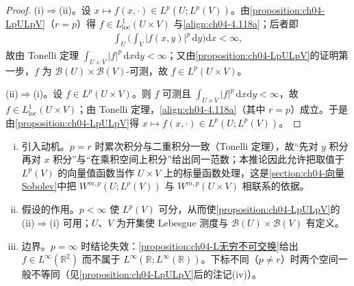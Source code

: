 \documentclass[../../main.tex]{subfiles}%
\begin{document}
\begin{proof}
(i)$\Rightarrow$(ii)。设 $x\mapsto f(x,\cdot)\in L^p(U;L^p(V))$。由\cref{proposition:ch04-LpULpV}（$r=p$）得 $f\in L^1_{\mathrm{loc}}(U\times V)$ 与\eqref{align:ch04-4.118a}；后者即
\begin{align*}
\int_U\Big(\int_V|f(x,y)|^p\,\mathrm{d}y\Big)\mathrm{d}x<\infty,
\end{align*}
故由 Tonelli 定理 $\int_{U\times V}|f|^p\,\mathrm{d}x\mathrm{d}y<\infty$；又由\cref{proposition:ch04-LpULpV}的证明第一步，$f$ 为 $\mathcal{B}(U)\times\mathcal{B}(V)$-可测，故 $f\in L^p(U\times V)$。

(ii)$\Rightarrow$(i)。设 $f\in L^p(U\times V)$。则 $f$ 可测且 $\int_{U\times V}|f|^p\,\mathrm{d}x\mathrm{d}y<\infty$，故 $f\in L^1_{\mathrm{loc}}(U\times V)$；由 Tonelli 定理，\eqref{align:ch04-4.118a}（其中 $r=p$）成立。于是由\cref{proposition:ch04-LpULpV}得 $x\mapsto f(x,\cdot)\in L^p(U;L^p(V))$。
\end{proof}

\begin{remark}
\begin{enumerate}[(i)]
\item 引入动机。$p=r$ 时累次积分与二重积分一致（Tonelli 定理），故“先对 $y$ 积分再对 $x$ 积分”与“在乘积空间上积分”给出同一范数；本推论因此允许把取值于 $L^p(V)$ 的向量值函数当作 $U\times V$ 上的标量函数处理，这是\cref{section:ch04-向量Sobolev}中把 $W^{m,p}(U;L^p(V))$ 与 $W^{m,p}(U\times V)$ 相联系的依据。

\item 假设的作用。$p<\infty$ 使 $L^p(V)$ 可分，从而使\cref{proposition:ch04-LpULpV}的 (ii)$\Rightarrow$(i) 可用；$U$、$V$ 为开集使 Lebesgue 测度与 $\mathcal{B}(U)\times\mathcal{B}(V)$ 有定义。

\item 边界。$p=\infty$ 时结论失效：\cref{proposition:ch04-L无穷不可交换}给出 $f\in L^\infty(\mathbb{R}^2)$ 而不属于 $L^\infty(\mathbb{R};L^\infty(\mathbb{R}))$。下标不同（$p\neq r$）时两个空间一般不等同（见\cref{proposition:ch04-LpULpV}后的注记(iv)）。
\end{enumerate}
\end{remark}
\end{document}
